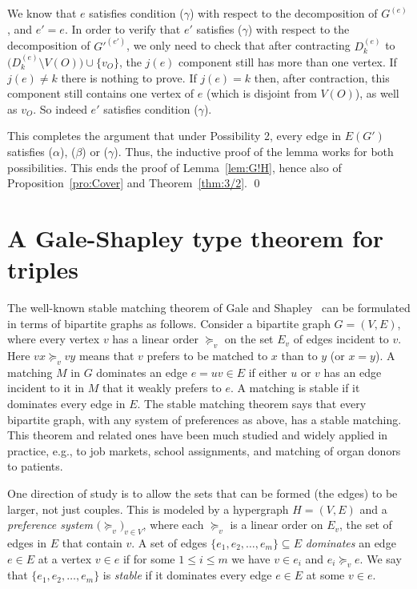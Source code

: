 \documentclass{article}
\theoremstyle{definition}
\begin{document}
We know that $e$ satisfies condition ($\gamma$) with respect to the decomposition of $G^{(e)}$, and $e' = e$. In order to verify that $e'$ satisfies ($\gamma$) with respect to the decomposition of $G'^{(e')}$, we only need to check that after contracting $D_k^{(e)}$ to $\bigl( D_k^{(e)} \setminus V(O)\bigr) \cup \{v_O\}$, the $j(e)$ component still has more than one vertex. If $j(e) \ne k$ there is nothing to prove. If $j(e) = k$ then, after contraction, this component still contains one vertex of $e$ (which is disjoint from $V(O)$), as well as $v_O$. So indeed $e'$ satisfies condition ($\gamma$).

This completes the argument that under Possibility 2, every edge in $E(G')$ satisfies ($\alpha$), ($\beta$) or ($\gamma$). Thus, the inductive proof of the lemma works for both possibilities. This ends the proof of Lemma~\ref{lem:G!H}, hence also of Proposition~\ref{pro:Cover} and Theorem~\ref{thm:3/2}. \qed

\section{A Gale-Shapley type theorem for triples}
The well-known stable matching theorem of Gale and Shapley~\cite{GS} can be formulated in terms of bipartite graphs as follows. Consider a bipartite graph $G = (V, E)$, where every vertex $v$ has a linear order $\succeq_v$ on the set $E_v$ of edges incident to $v$. Here $vx \succeq_v vy$ means that $v$ prefers to be matched to $x$ than to $y$ (or $x=y$). A matching $M$ in $G$ dominates an edge $e = uv \in E$ if either $u$ or $v$ has an edge incident to it in $M$ that it weakly prefers to $e$. A matching is stable if it dominates every edge in $E$. The stable matching theorem says that every bipartite graph, with any system of preferences as above, has a stable matching. This theorem and related ones have been much studied and widely applied in practice, e.g., to job markets, school assignments, and matching of organ donors to patients.

One direction of study is to allow the sets that can be formed (the edges) to be larger, not just couples. This is modeled by a hypergraph $H = (V, E)$ and a \emph{preference system} $\bigl( \succeq_v\bigr)_{v \in V}$, where each $\succeq_v$ is a linear order on $E_v$, the set of edges in $E$ that contain $v$. A set of edges $\{e_1, e_2, \ldots , e_m\} \subseteq E$ \emph{dominates} an edge $e \in E$ at a vertex $v \in e$ if for some $1 \le i \le m$ we have $v \in e_i$ and $e_i \succeq_v e$. We say that $\{e_1, e_2, \ldots , e_m\}$ is \emph{stable} if it dominates every edge $e \in E$ at some $v \in e$.
\end{document}
